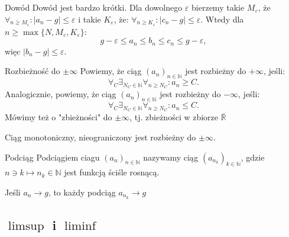 \documentclass{article}
\numberwithin{defi}{section}
\numberwithin{theo}{section}
\numberwithin{defi}{section}
\newcommand{\R}{\mathbb{R}}
\newcommand{\N}{\mathbb{N}}
\newcommand{\oo}{\infty}
\newcommand{\eps}{\varepsilon}
\newcommand{\ciag}[1]{(#1_{n})_{n \in \N}}
\begin{document}
\begin{dow}{Dowód}
    Dowód jest bardzo krótki. Dla dowolnego $\eps$ bierzemy takie $M_{\eps}$, że $\forall_{n \geqslant M_{\eps}}: |a_n - g| \leqslant \eps $ i takie $K_{\eps}$, że: $\forall_{n \geqslant K_{\eps}}: |c_n - g| \leqslant \eps $. Wtedy dla $n \geqslant \max\{N, M_\eps, K_\eps \}$: \begin{equation}
        g - \eps \leqslant a_n \leqslant b_n \leqslant c_n \leqslant g - \eps,
    \end{equation}
    więc $|b_n - g| \leqslant \eps$.
\end{dow}



\begin{defr}{Rozbieżność do $\pm \oo$}
    Powiemy, że ciąg $\ciag{a}$ jest rozbieżny do $+\oo$, jeśli: \begin{equation}
        \forall_C \exists_{N_C \in \N} \forall_{n \geqslant N_C}: a_n \geqslant C.
    \end{equation}
    Analogicznie, powiemy, że ciąg $\ciag{a}$ jest rozbieżny do $-\oo$, jeśli: \begin{equation}
        \forall_C \exists_{N_C \in \N} \forall_{n \geqslant N_C}: a_n \leqslant C.
    \end{equation}
    Mówimy też o "zbieżności" do $\pm \oo$, tj. zbieżności w zbiorze $\overline{\R}$
\end{defr}

\begin{obs}{}
    Ciąg monotoniczny, nieograniczony jest rozbieżny do $\pm \oo$.
\end{obs}

\begin{defr}{Podciąg}
    Podciągiem ciagu $\ciag{a}$ nazywamy ciąg $(a_{n_k})_{k \in \N}$, gdzie $n \ni k \mapsto n_k \in \N$ jest funkcją ściśle rosnącą.
\end{defr}


\begin{obs}{}
    Jeśli $a_n \to g$, to każdy podciąg $a_{n_k} \to g$
\end{obs}





\subsection{$\limsup$ i $\liminf$}
\end{document}
